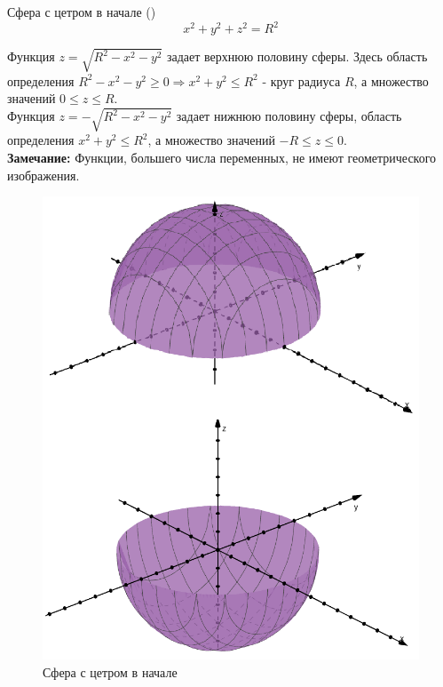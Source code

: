 \begin{minipage}{\linewidth}
	\begin{minipage}{0.6\linewidth}
		\begin{tbox*}{Сфера с цетром в начале ()}
			\[\boxed{x^2 + y^2 + z^2 = R^2}\]

			Функция $z = \sqrt{R^2 - x^2 - y^2}$ задает верхнюю половину сферы. Здесь область определения $R^2 -x^2 - y^2 \geqslant 0 \Rightarrow x^2 + y^2 \leqslant R^2$ - круг радиуса $R$, а множество значений $0 \leqslant z \leqslant R$.\\

			Функция $z = -\sqrt{R^2 - x^2 - y^2}$ задает нижнюю половину сферы, область определения $x^2 + y^2 \leqslant R^2$, а множество значений $-R \leqslant z \leqslant 0$.\\

			\textbf{Замечание: } Функции, большего числа переменных, не имеют геометрического изображения.
		\end{tbox*}
	\end{minipage}
	\begin{minipage}{0.35\linewidth}
		\begin{figure}[H]
			\centering
			\includegraphics[width=0.9\linewidth]{image/screenshot007.png}
			\caption{Сфера с цетром в начале}
			\label{fig:1.2.1.3}
		\end{figure}
	\end{minipage}
\end{minipage}
